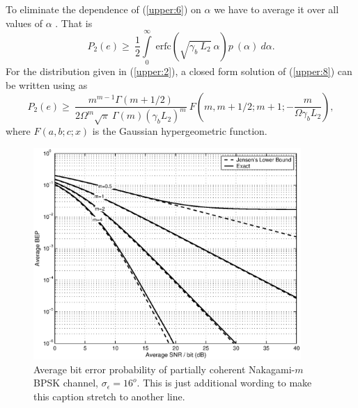 To eliminate the dependence of (\ref{upper:6}) on $\alpha$ we have
to average it over all values of $\alpha$ . That is
\begin{equation}
\label{upper:8} P_2(e)\ge~\frac{1}{2}
\int\limits_{0}^{\infty}~\mbox{erfc}\left(\sqrt{\gamma_b~L_2}~\alpha\right)p~(\alpha)~d\alpha.
\end{equation}
For the distribution given in (\ref{upper:2}), a closed form
solution of (\ref{upper:8}) can be written using \cite[eq.
6.286.1]{gradeshteyn:1994} as
\begin{equation}
\label{upper:9}
P_2(e)\ge~\frac{m^{m-1}\Gamma(m+1/2)}{2\Omega^m\sqrt\pi~\Gamma(m)\left(\gamma_bL_2\right)^m}~
F\left(m,m+1/2;m+1;-\frac{m}{\Omega\gamma_bL_2}\right),
\end{equation}
where $F(a,b;c;x)$  is the Gaussian hypergeometric function.
\begin{figure}[tbp]
\centerline{\includegraphics[width=4in]{./upper001.eps}} 
\caption[{\vspace{-2ex}Average bit error probability of partially coherent Nakagami-$m$ \newline \vspace{-2ex} \hspace*{-4pt} BPSK channel, $\sigma_\epsilon=16^o$}.  This is just additional wording to make 
\newline  \hspace*{0pt} this caption stretch to another line.]
{Average bit error probability of partially coherent Nakagami-$m$ BPSK channel, $\sigma_\epsilon=16^o$.  This is just additional wording to make this caption stretch to another line.}
\end{figure}
